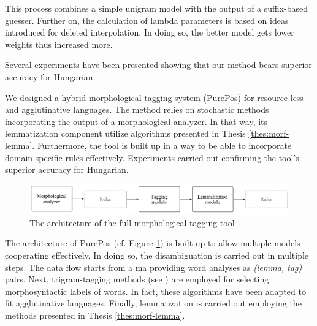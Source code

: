 This process combines a simple unigram model with the output of a suffix-based guesser. 
Further on, the calculation of lambda parameters is based on ideas introduced for deleted interpolation.
In doing so, the better model gets lower weights thus increased more.

Several experiments have been presented showing that our method bears superior accuracy for Hungarian. 

\thesisline%


\begin{core}
\begin{thesis}\label{thes:morf-tagging}
We designed a hybrid morphological tagging system (PurePos) for resource-less and agglutinative languages.
The method relies on stochastic methods incorporating the output of a morphological analyzer.
In that way, its lemmatization component utilize algorithms presented in Thesis \ref{thes:morf-lemma}.
Furthermore, the tool is built up in a way to be able to incorporate domain-specific rules effectively.
Experiments carried out confirming the tool's superior accuracy for Hungarian.
\end{thesis}

\begin{pub}
\cite{Orosz2011,Orosz2012,Orosz2012a,Orosz2013a}
\end{pub}
\end{core}

\begin{figure}[ht] 
  \centering
  \includegraphics[width=1\textwidth]{MorphTagging/architecture.png} 
  \caption{The architecture of the full morphological tagging tool}
  \label{fig:purepos-arch_en}
\end{figure}

The architecture of PurePos (cf. Figure \ref{fig:purepos-arch_en}) is built up to allow multiple models cooperating effectively. 
In doing so, the disambiguation is carried out in multiple steps.
The data flow starts from a \acrshort{ma} providing word analyses as \emph{(lemma, tag)} pairs. 
Next, trigram-tagging methods (see \cite{Brants2000,Halacsy2007}) are employed for selecting morphosyntactic labels of words. 
In fact, these algorithms have been adapted to fit agglutinative languages.
Finally, lemmatization is carried out employing the methods presented in Thesis \ref{thes:morf-lemma}. 


